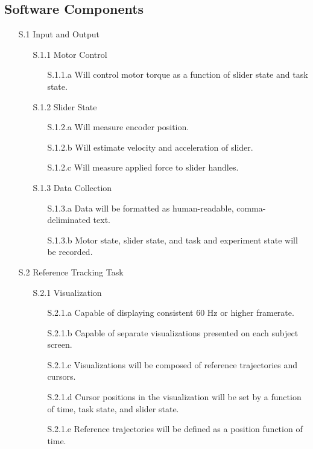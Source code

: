 \documentclass{article}
\begin{document}
\subsection*{Software Components}
    \begin{enumerate}
      \item[S.1] Input and Output
      \begin{enumerate}

        \item[S.1.1] Motor Control
          \begin{enumerate}
          \item[S.1.1.a] Will control motor torque as a function of slider state and task state.
          \end{enumerate}

        \item[S.1.2] Slider State
          \begin{enumerate}
          \item[S.1.2.a] Will measure encoder position.
          \item[S.1.2.b] Will estimate velocity and acceleration of slider.
          \item[S.1.2.c] Will measure applied force to slider handles.
          \end{enumerate}

        \item[S.1.3] Data Collection
          \begin{enumerate}
            \item[S.1.3.a] Data will be formatted as human-readable, comma-deliminated text.
            \item[S.1.3.b] Motor state, slider state, and task and experiment state will be recorded.
          \end{enumerate}

      \end{enumerate}

    \item[S.2] Reference Tracking Task
        \begin{enumerate}

        \item[S.2.1] Visualization
            \begin{enumerate}
            \item[S.2.1.a] Capable of displaying consistent 60 Hz or higher framerate.
            \item[S.2.1.b] Capable of separate visualizations presented on each subject screen.
            \item[S.2.1.c] Visualizations will be composed of reference trajectories and cursors.
            \item[S.2.1.d] Cursor positions in the visualization will be set by a function of time, task state, and slider state.
            \item[S.2.1.e] Reference trajectories will be defined as a position function of time.
            \end{enumerate}


\end{enumerate}
\end{enumerate}
\end{document}
